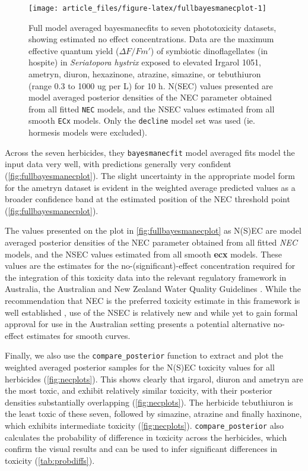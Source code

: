 \documentclass[
  shortnames]{jss}
\begin{document}
\begin{CodeChunk}
\begin{figure}[!ht]

{\centering \texttt{[image: article\_files/figure-latex/fullbayesmanecplot-1]} 

}

\caption{Full model averaged bayesmanecfits to seven phototoxicity datasets, showing estimated no effect concentrations. Data are the maximum effective quantum yield ($\Delta F / Fm'$) of symbiotic dinoflagellates (in hospite) in \textit{Seriatopora hystrix} exposed to elevated Irgarol 1051, ametryn, diuron, hexazinone, atrazine, simazine, or tebuthiuron (range 0.3 to 1000 ug per L) for 10 h. N(SEC) values presented are model averaged posterior densities of the NEC parameter obtained from all fitted \texttt{NEC} models, and the NSEC values estimated from all smooth \texttt{ECx} models. Only the \texttt{decline} model set was used (ie. hormesis models were excluded).}\label{fig:fullbayesmanecplot}
\end{figure}
\end{CodeChunk}

Across the seven herbicides, they \texttt{bayesmanecfit} model averaged fits model the input data very well, with predictions generally very confident (\autoref{fig:fullbayesmanecplot}). The slight uncertainty in the appropriate model form for the ametryn dataset is evident in the weighted average predicted values as a broader confidence band at the estimated position of the NEC threshold point (\autoref{fig:fullbayesmanecplot}).

The values presented on the plot in \autoref{fig:fullbayesmanecplot} as N(S)EC are model averaged posterior densities of the NEC parameter obtained from all fitted \emph{NEC} models, and the NSEC values estimated from all smooth \textbf{ecx} models. These values are the  estimates for the no-(significant)-effect concentration required for the integration of this toxicity data into the relevant regulatory framework in Australia, the Australian and New Zealand Water Quality Guidelines \citep{anzg}. While the recommendation that NEC is the preferred toxicity estimate in this framework is well established \citep[\citet{Warne2018c}]{Warne2015}, use of the NSEC is relatively new \citep{Fisher2023} and while yet to gain formal approval for use in the Australian setting presents a potential alternative no-effect estimates for smooth curves.

Finally, we also use the \texttt{compare\_posterior} function to extract and plot the weighted averaged posterior samples for the N(S)EC toxicity values for all herbicides (\autoref{fig:necplots}). This shows clearly that irgarol, diuron and ametryn are the most toxic, and exhibit relatively similar toxicity, with their posterior densities substantially overlapping (\autoref{fig:necplots}). The herbicide tebuthiuron is the least toxic of these seven, followed by simazine, atrazine and finally haxinone, which exhibits intermediate toxicity (\autoref{fig:necplots}). \texttt{compare\_posterior} also calculates the probability of difference in toxicity across the herbicides, which confirm the visual results and can be used to infer significant differences in toxicity (\autoref{tab:probdiffs}).
\end{document}
